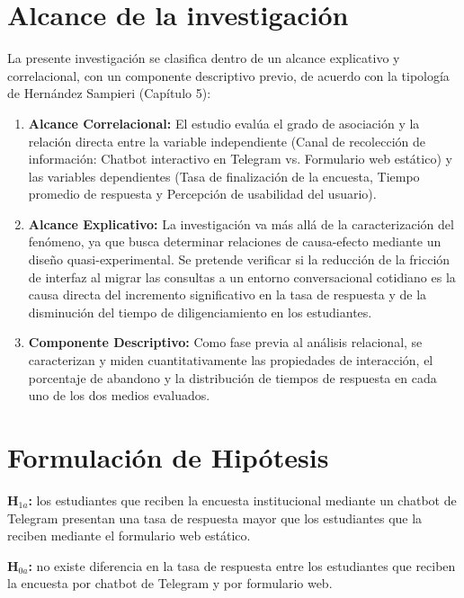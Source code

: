\documentclass[12pt,letterpaper]{article}
\begin{document}
\section{Alcance de la investigación}

La presente investigación se clasifica dentro de un alcance explicativo y correlacional, con un componente descriptivo previo, de acuerdo con la tipología de Hernández Sampieri (Capítulo 5):

\begin{enumerate}
\item \textbf{Alcance Correlacional:} El estudio evalúa el grado de asociación y la relación directa entre la variable independiente (Canal de recolección de información: Chatbot interactivo en Telegram vs. Formulario web estático) y las variables dependientes (Tasa de finalización de la encuesta, Tiempo promedio de respuesta y Percepción de usabilidad del usuario).

\item \textbf{Alcance Explicativo:} La investigación va más allá de la caracterización del fenómeno, ya que busca determinar relaciones de causa-efecto mediante un diseño quasi-experimental. Se pretende verificar si la reducción de la fricción de interfaz al migrar las consultas a un entorno conversacional cotidiano es la causa directa del incremento significativo en la tasa de respuesta y de la disminución del tiempo de diligenciamiento en los estudiantes.

\item \textbf{Componente Descriptivo:} Como fase previa al análisis relacional, se caracterizan y miden cuantitativamente las propiedades de interacción, el porcentaje de abandono y la distribución de tiempos de respuesta en cada uno de los dos medios evaluados.

\end{enumerate}


\section{Formulación de Hipótesis}
\textbf{H$_{1a}$:} los estudiantes que reciben la encuesta institucional mediante un chatbot de Telegram presentan una tasa de respuesta mayor que los estudiantes que la reciben mediante el formulario web estático.

\textbf{H$_{0a}$:} no existe diferencia en la tasa de respuesta entre los estudiantes que reciben la encuesta por chatbot de Telegram y por formulario web.
\end{document}
